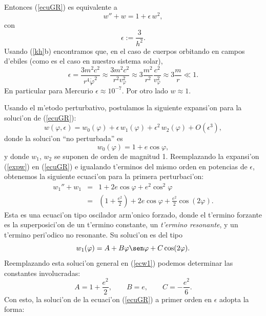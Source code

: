 Entonces (\ref{ecuGR})  es equivalente a
\begin{equation}
w''+w=1+\epsilon\,w^2 ,\label{ecwGR}
\end{equation}
con
\begin{equation}
 \epsilon:=\frac{3}{h^2}.
\end{equation}
Usando (\ref{kh}b) encontramos que, en el caso de cuerpos orbitando en campos
d'ebiles (como es el caso en nuestro sistema solar),
\begin{equation}
 \epsilon=\frac{3m^2c^2}{r^4\dot\varphi^2}\approx\frac{3m^2c^2}{r^2v_\varphi^2}
 \approx 3\frac{m^2}{r^2}\frac{c^2}{v_\varphi^2}\approx 3\frac{m}{r}\ll 1.
\end{equation}
En particular para Mercurio $\epsilon\approx 10^{-7}$. Por otro lado $w\approx
1$.

Usando el m'etodo perturbativo, postulamos la siguiente expansi'on para la soluci'on de (\ref{ecuGR}):
\begin{equation}
w(\varphi,\epsilon)=w_0(\varphi)+\epsilon\, w_1(\varphi) +\epsilon^2\,w_2(\varphi)+O(\epsilon^3), \label{expw}
\end{equation}
donde la soluci'on ``no perturbada'' es
\begin{equation}
 w_0(\varphi)=1+e\cos\varphi ,
\end{equation}
y donde $w_1$, $w_2$ se suponen de orden de magnitud 1. Reemplazando la expansi'on (\ref{expw}) en (\ref{ecuGR}) e igualando t'erminos del mismo orden en potencias de $\epsilon$, obtenemos la siguiente ecuaci'on para la primera perturbaci'on:
\begin{eqnarray}
 w_1''+w_1&=&1+2e\cos\varphi+e^2\cos^2\varphi \\
&=& (1+\frac{e^2}{2})+2e\cos\varphi+\frac{e^2}{2}\cos(2\varphi). \label{ecw1}
\end{eqnarray}
Esta es una ecuaci'on tipo oscilador arm'onico forzado, donde el t'ermino forzante es la superposici'on de un t'ermino constante, un \textit{t'ermino resonante}, y un t'ermino peri'odico no resonante. Su soluci'on es del tipo
\begin{equation}
 w_1(\varphi)=A+B\varphi\sen\varphi+C\cos(2\varphi).
\end{equation}
Reemplazando esta soluci'on general en (\ref{ecw1}) podemos determinar las constantes involucradas:
\begin{equation}
 A=1+\frac{e^2}{2}, \qquad B=e, \qquad C=-\frac{e^2}{6}.
\end{equation}
Con esto, la soluci'on de la ecuaci'on (\ref{ecuGR}) a primer orden en $\epsilon$ adopta la forma:
